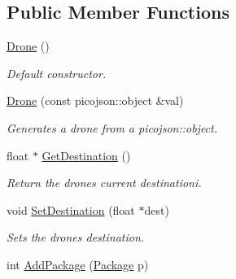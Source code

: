 \subsection*{Public Member Functions}
\begin{DoxyCompactItemize}
\item 
\mbox{\label{classcsci3081_1_1Drone_a7f34f6af6b978ce99ace8b15d13159c8}} 
\hyperlink{classcsci3081_1_1Drone_a7f34f6af6b978ce99ace8b15d13159c8}{Drone} ()
\begin{DoxyCompactList}\small\item\em Default constructor. \end{DoxyCompactList}\item 
\mbox{\label{classcsci3081_1_1Drone_ae6875af07d7f09ce59e2e2a62e5bd7d8}} 
\hyperlink{classcsci3081_1_1Drone_ae6875af07d7f09ce59e2e2a62e5bd7d8}{Drone} (const picojson\+::object \&val)
\begin{DoxyCompactList}\small\item\em Generates a drone from a picojson\+::object. \end{DoxyCompactList}\item 
\mbox{\label{classcsci3081_1_1Drone_a888170a040c9d1138b3e57f7672efa7c}} 
float $\ast$ \hyperlink{classcsci3081_1_1Drone_a888170a040c9d1138b3e57f7672efa7c}{Get\+Destination} ()
\begin{DoxyCompactList}\small\item\em Return the drone\textquotesingle{}s current destinationi. \end{DoxyCompactList}\item 
\mbox{\label{classcsci3081_1_1Drone_acf2725b427d9e0341107096a8b7ffaf1}} 
void \hyperlink{classcsci3081_1_1Drone_acf2725b427d9e0341107096a8b7ffaf1}{Set\+Destination} (float $\ast$dest)
\begin{DoxyCompactList}\small\item\em Sets the drone\textquotesingle{}s destination. \end{DoxyCompactList}\item 
\mbox{\label{classcsci3081_1_1Drone_a6373d2209bd49b083cffa3c2d2af9bce}} 
int \hyperlink{classcsci3081_1_1Drone_a6373d2209bd49b083cffa3c2d2af9bce}{Add\+Package} (\hyperlink{classcsci3081_1_1Package}{Package} p)

\end{DoxyCompactItemize}
